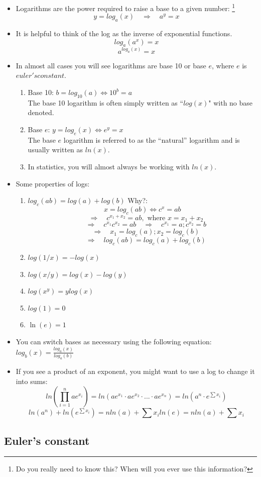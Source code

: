 \documentclass[12pt]{extarticle}
\newcommand{\bi}{\begin{itemize}}
\newcommand{\ei}{\end{itemize}}
\newcommand{\be}{\begin{enumerate}}
\newcommand{\ee}{\end{enumerate}}
\newcommand{\lra}{\Longrightarrow}
\newcommand{\qlq}{\quad\lra\quad}
\begin{document}
\bi
\item Logarithms are the power required to raise a base to a given
  number: \footnote{Do you really need to know this?  When will you
    ever use this information?} \\
$$y = log_a(x) \qlq a^y = x$$
\item It is helpful to think of the log as the inverse of exponential
  functions.  
$$log_a(a^x) = x$$ 
$$a^{log_a(x)}=x$$
\item In almost all cases you will see logarithms are base 10 or base
  $e$, where $e$ is $euler's constant$.
\be
\item Base 10: $b = log_{10}(a) \iff 10^b = a$ \\
The base 10 logarithm is often simply written as ``$log(x)$" with no
base denoted.
\item Base $e$: $y=log_e(x) \iff e^y = x$ \\
The base $e$ logarithm is referred to as the ``natural'' logarithm and
is usually written as  $ln(x)$.
\item In statistics, you will almost always be working with $ln(x)$.
\ee
\item Some properties of logs:
\be
\item $log_c(ab) = log(a) + log(b)$ Why?:\\
$$ x = log_c(ab) \iff c^x=ab $$
$$\qlq c^{x_1+x_2} = ab, \mbox{  where } x = x_1 + x_2$$
$$\qlq c^{x_1}c^{x_2}=ab \qlq c^{x_1}=a; c^{x_2}=b$$
$$\qlq x_1 = log_c(a); x_2 = log_c(b) $$
$$\qlq log_c(ab) = log_c(a) + log_c(b)$$
\item $log(1/x) = - log(x)$
\item $log(x/y) = log(x) - log(y)$
\item $log(x^y) = ylog(x)$
\item $log(1) = 0$
\item $\ln(e)=1$
\ee
\item You can switch bases as necessary using the following equation:
  $log_b(x) = \frac{log_a(x)}{log_a(b)}$
\item If you see a product of an exponent, you might want to use a log
  to change it into sums:
$$ln(\prod_{i=1}^nae^{x_i}) = ln(ae^{x_1} \cdot ae^{x_2} \cdot ... \cdot ae^{x_n}) = ln(a^n \cdot e^{\sum x_i})$$
$$ ln(a^n) + ln(e^{\sum x_i}) = nln(a) + \sum x_i ln(e) = nln(a) + \sum x_i $$
 
\ei


\subsection{Euler's constant}
\end{document}
